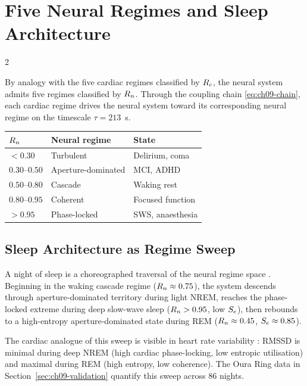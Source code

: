 \section{Five Neural Regimes and Sleep Architecture}
\label{sec:ch09-neural}

\begin{multicols}{2}

By analogy with the five cardiac regimes classified by $R_c$, the
neural system admits five regimes classified by $R_n$. Through the
coupling chain \eqref{eq:ch09-chain}, each cardiac regime drives
the neural system toward its corresponding neural regime on the
timescale $\tau = 213$~s.

\begin{center}
\begin{tabular}{lll}
\toprule
$R_n$ & Neural regime & State \\
\midrule
$< 0.30$ & Turbulent & Delirium, coma \\
$0.30$--$0.50$ & Aperture-dominated & MCI, ADHD \\
$0.50$--$0.80$ & Cascade & Waking rest \\
$0.80$--$0.95$ & Coherent & Focused function \\
$> 0.95$ & Phase-locked & SWS, anaesthesia \\
\bottomrule
\end{tabular}
\label{tab:ch09-neural}
\end{center}

\subsection{Sleep Architecture as Regime Sweep}

A night of sleep is a choreographed traversal of the neural regime
space \citep{walker2017sleep,steriade1993thalamocortical}. Beginning
in the waking cascade regime ($R_n \approx 0.75$), the system descends
through aperture-dominated territory during light NREM, reaches the
phase-locked extreme during deep slow-wave sleep ($R_n > 0.95$, low
$S_e$), then rebounds to a high-entropy aperture-dominated state
during REM ($R_n \approx 0.45$, $S_e \approx 0.85$).

\columnbreak

The cardiac analogue of this sweep is visible in heart rate variability
\citep{tobaldini2013heart,somers1993sympathetic}: RMSSD is minimal
during deep NREM (high cardiac phase-locking, low entropic utilisation)
and maximal during REM (high entropy, low coherence). The Oura Ring
data in Section~\ref{sec:ch09-validation} quantify this sweep across
86 nights.


\end{multicols}
